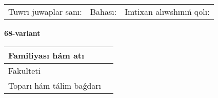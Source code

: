 \documentclass{article}
\begin{document}
\vspace{1cm}

\begin{tabular}{lll}
Tuwrı juwaplar sanı: \underline{\hspace{1.5cm}} & 
Bahası: \underline{\hspace{1.5cm}} & 
Imtixan alıwshınıń qolı: \underline{\hspace{2cm}} \\
\end{tabular}

\egroup

\newpage


\textbf{68-variant}\\

\bgroup
\def\arraystretch{1.6} %

\begin{tabular}{|m{5.7cm}|m{9.5cm}|}
\hline
Familiyası hám atı & \\
\hline
Fakulteti  & \\
\hline
Toparı hám tálim baǵdarı  & \\
\hline
\end{tabular}

\vspace{1cm}
\end{document}
